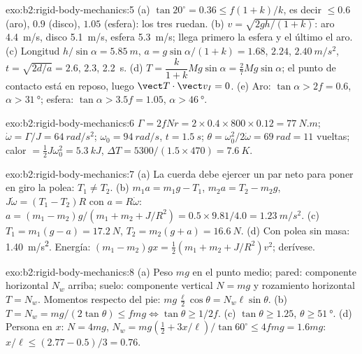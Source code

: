 \begin{solution}{exo:b2:rigid-body-mechanics:5}
(a) $\tan20^\circ = 0.36 \le f(1 + k)/k$, es decir $\le 0.6$ (aro), $0.9$
(disco), $1.05$ (esfera): los tres ruedan. (b) $v = \sqrt{2gh/(1 + k)}$: aro
\qty{4.4}{m/s}, disco \qty{5.1}{m/s}, esfera \qty{5.3}{m/s}; llega primero
la esfera y el último el aro. (c) Longitud $h/\sin\alpha = \qty{5.85}{m}$, $a = g\sin\alpha/(1 + k) =
1.68$, $2.24$, $\qty{2.40}{m/s^2}$, $t = \sqrt{2d/a} = 2.6$, $2.3$, \qty{2.2}{s}.
(d) $T = \dfrac{k}{1 + k}Mg\sin\alpha = \tfrac27Mg\sin\alpha$; el punto de
contacto está en reposo, luego $\vect T\cdot\vect v_I = 0$. (e) Aro: $\tan\alpha >
2f = 0.6$, $\alpha > \qty{31}{\degree}$; esfera: $\tan\alpha > 3.5f = 1.05$,
$\alpha > \qty{46}{\degree}$.
\end{solution}

\begin{solution}{exo:b2:rigid-body-mechanics:6}
$\Gamma = 2fNr = 2 \times 0.4 \times 800 \times 0.12 = \qty{77}{N.m}$; $\dot\omega =
\Gamma/J = \qty{64}{rad/s^2}$; $\omega_0 = \qty{94}{rad/s}$, $t = \qty{1.5}{s}$;
$\theta = \omega_0^2/2\dot\omega = \qty{69}{rad} = 11$ vueltas; calor $= \tfrac12J
\omega_0^2 = \qty{5.3}{kJ}$, $\Delta T = 5300/(1.5 \times 470) = \qty{7.6}{K}$.
\end{solution}

\begin{solution}{exo:b2:rigid-body-mechanics:7}
(a) La cuerda debe ejercer un par neto para poner en giro la polea: $T_1 \ne T_2$.
(b) $m_1a = m_1g - T_1$, $m_2a = T_2 - m_2g$, $J\dot\omega = (T_1 - T_2)R$ con
$a = R\dot\omega$: $a = (m_1 - m_2)g/(m_1 + m_2 + J/R^2) = 0.5 \times 9.81/4.0 =
\qty{1.23}{m/s^2}$. (c) $T_1 = m_1(g - a) = \qty{17.2}{N}$, $T_2 = m_2(g + a) =
\qty{16.6}{N}$. (d) Con polea sin masa: \qty{1.40}{m/s^2}. Energía: $(m_1 - m_2)gx =
\tfrac12(m_1 + m_2 + J/R^2)v^2$; derívese.
\end{solution}

\begin{solution}{exo:b2:rigid-body-mechanics:8}
(a) Peso $mg$ en el punto medio; pared: componente horizontal $N_w$ arriba;
suelo: componente vertical $N = mg$ y rozamiento horizontal $T = N_w$.
Momentos respecto del pie: $mg\,\tfrac{\ell}2\cos\theta = N_w\ell\sin\theta$. (b) $T = N_w =
mg/(2\tan\theta) \le fmg \iff \tan\theta \ge 1/2f$. (c) $\tan\theta \ge
1.25$, $\theta \ge \qty{51}{\degree}$. (d) Persona en $x$: $N = 4mg$, $N_w =
mg(\tfrac12 + 3x/\ell)/\tan60^\circ \le 4fmg = 1.6mg$: $x/\ell \le (2.77 -
0.5)/3 = 0.76$.
\end{solution}

